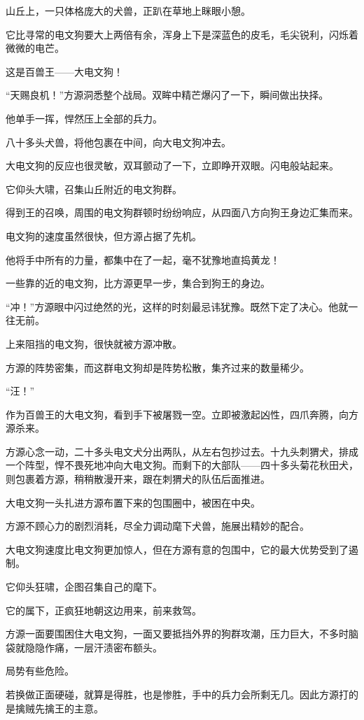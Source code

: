 \begin{this_body}
山丘上，一只体格庞大的犬兽，正趴在草地上眯眼小憩。

它比寻常的电文狗要大上两倍有余，浑身上下是深蓝色的皮毛，毛尖锐利，闪烁着微微的电芒。

这是百兽王——大电文狗！

“天赐良机！”方源洞悉整个战局。双眸中精芒爆闪了一下，瞬间做出抉择。

他单手一挥，悍然压上全部的兵力。

八十多头犬兽，将他包裹在中间，向大电文狗冲去。

大电文狗的反应也很灵敏，双耳颤动了一下，立即睁开双眼。闪电般站起来。

它仰头大啸，召集山丘附近的电文狗群。

得到王的召唤，周围的电文狗群顿时纷纷响应，从四面八方向狗王身边汇集而来。

电文狗的速度虽然很快，但方源占据了先机。

他将手中所有的力量，都集中在了一起，毫不犹豫地直捣黄龙！

一些靠的近的电文狗，比方源更早一步，集合到狗王的身边。

“冲！”方源眼中闪过绝然的光，这样的时刻最忌讳犹豫。既然下定了决心。他就一往无前。

上来阻挡的电文狗，很快就被方源冲散。

方源的阵势密集，而这群电文狗却是阵势松散，集齐过来的数量稀少。

“汪！”

作为百兽王的大电文狗，看到手下被屠戮一空。立即被激起凶性，四爪奔腾，向方源杀来。

方源心念一动，二十多头电文犬分出两队，从左右包抄过去。十九头刺猬犬，排成一个阵型，悍不畏死地冲向大电文狗。而剩下的大部队——四十多头菊花秋田犬，则包裹着方源，稍稍散漫开来，跟在刺猬犬的队伍后面推进。

大电文狗一头扎进方源布置下来的包围圈中，被困在中央。

方源不顾心力的剧烈消耗，尽全力调动麾下犬兽，施展出精妙的配合。

大电文狗速度比电文狗更加惊人，但在方源有意的包围中，它的最大优势受到了遏制。

它仰头狂啸，企图召集自己的麾下。

它的属下，正疯狂地朝这边用来，前来救驾。

方源一面要围困住大电文狗，一面又要抵挡外界的狗群攻潮，压力巨大，不多时脑袋就隐隐作痛，一层汗渍密布额头。

局势有些危险。

若换做正面硬碰，就算是得胜，也是惨胜，手中的兵力会所剩无几。因此方源打的是擒贼先擒王的主意。


\end{this_body}
